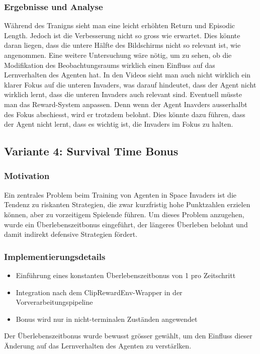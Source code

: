 \documentclass{article}
\begin{document}
\subsubsection{Ergebnisse und Analyse}
Während des Tranigns sieht man eine leicht erhöhten Return und Episodic Length. Jedoch ist die Verbesserung nicht so gross wie erwartet. Dies könnte daran liegen, dass die untere Hälfte des Bildschirms nicht so relevant ist, wie angenommen. Eine weitere Untersuchung wäre nötig, um zu sehen, ob die Modifikation des Beobachtungsraums wirklich einen Einfluss auf das Lernverhalten des Agenten hat.
In den Videos sieht man auch nicht wirklich ein klarer Fokus auf die unteren Invaders, was darauf hindeutet, dass der Agent nicht wirklich lernt, dass die unteren Invaders auch relevant sind.
Eventuell müsste man das Reward-System anpassen. Denn wenn der Agent Inavders ausserhalbt des Fokus abschiesst, wird er trotzdem belohnt. Dies könnte dazu führen, dass der Agent nicht lernt, dass es wichtig ist, die Invaders im Fokus zu halten.

\newpage
\subsection{Variante 4: Survival Time Bonus}
\subsubsection{Motivation}
Ein zentrales Problem beim Training von Agenten in Space Invaders ist die Tendenz zu riskanten Strategien, die zwar kurzfristig hohe Punktzahlen erzielen können, aber zu vorzeitigem Spielende führen. Um dieses Problem anzugehen, wurde ein Überlebenszeitbonus eingeführt, der längeres Überleben belohnt und damit indirekt defensive Strategien fördert.

\subsubsection{Implementierungsdetails}
\begin{itemize}
    \item Einführung eines konstanten Überlebenszeitbonus von 1 pro Zeitschritt
    \item Integration nach dem ClipRewardEnv-Wrapper in der Vorverarbeitungspipeline
    \item Bonus wird nur in nicht-terminalen Zuständen angewendet
\end{itemize}

Der Überlebenszeitbonus wurde bewusst grösser gewählt, um den Einfluss dieser Änderung auf das Lernverhalten des Agenten zu verstärlken.
\end{document}
